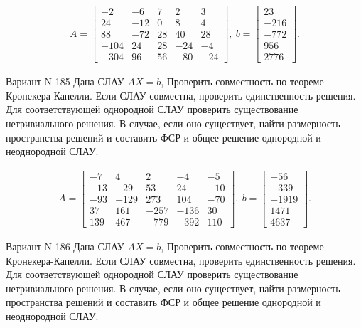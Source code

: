 \documentclass[11pt]{report}
\begin{document}
\begin{align*}
 A = \left[\begin{matrix}-2 & -6 & 7 & 2 & 3\\24 & -12 & 0 & 8 & 4\\88 & -72 & 28 & 40 & 28\\-104 & 24 & 28 & -24 & -4\\-304 & 96 & 56 & -80 & -24\end{matrix}\right],
\ b = \left[\begin{matrix}23\\-216\\-772\\956\\2776\end{matrix}\right]. 
 \end{align*}

Вариант N 185
Дана СЛАУ $AX = b$,
Проверить совместность по теореме Кронекера-Капелли. Если СЛАУ совместна, проверить единственность решения.
Для соответствующей однородной СЛАУ проверить существование нетривиального решения. В случае, если оно существует,
найти размерность пространства решений и составить ФСР и общее решение однородной  и неоднородной СЛАУ.


\begin{align*}
 A = \left[\begin{matrix}-7 & 4 & 2 & -4 & -5\\-13 & -29 & 53 & 24 & -10\\-93 & -129 & 273 & 104 & -70\\37 & 161 & -257 & -136 & 30\\139 & 467 & -779 & -392 & 110\end{matrix}\right],
\ b = \left[\begin{matrix}-56\\-339\\-1919\\1471\\4637\end{matrix}\right]. 
 \end{align*}

Вариант N 186
Дана СЛАУ $AX = b$,
Проверить совместность по теореме Кронекера-Капелли. Если СЛАУ совместна, проверить единственность решения.
Для соответствующей однородной СЛАУ проверить существование нетривиального решения. В случае, если оно существует,
найти размерность пространства решений и составить ФСР и общее решение однородной  и неоднородной СЛАУ.
\end{document}
